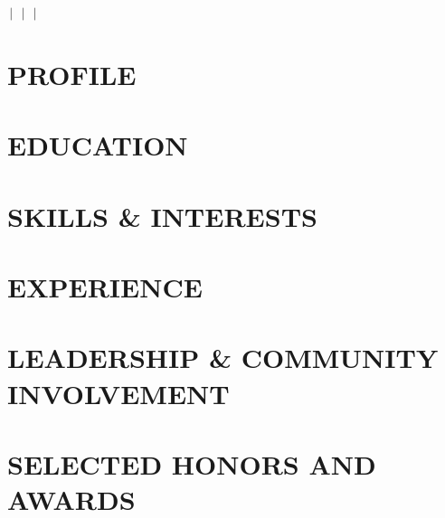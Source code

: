 \documentclass[letterpaper,10pt]{article}
\newcommand{\ShortURL}[1]{%
  \IfSubStr{#1}{://}{%
    \StrBehind{#1}{://}[\urlbody]%
    \urlbody
  }{#1}%
}
\newcommand{\Name}{}
\newcommand{\Title}{}
\newcommand{\Phone}{}
\newcommand{\Email}{}
\newcommand{\Location}{}
\newcommand{\LinkedInURL}{}
\newcommand{\WebsiteURL}{}
\newcommand{\MakeHeader}{%
  \begin{center}
    {\large\bfseries \Name}\\
    \vspace{0.2em}
    {\itshape \Title}\\
    \vspace{0.2em}
    \Phone \,$|$\, 
    \href{mailto:\Email}{\Email} \,$|$\, 
    \href{\LinkedInURL}{\ShortURL{\LinkedInURL}} \,$|$\, 
    \href{\WebsiteURL}{\ShortURL{\WebsiteURL}}\\
    \vspace{0.2em}
    \Location
  \end{center}
}
\newcommand{\ProfileText}{}
\begin{document}


\MakeHeader

\section{PROFILE}
\ProfileText

\section{EDUCATION}
\EducationEntries

\section{SKILLS \& INTERESTS}
\SkillsText

\section{EXPERIENCE}
\ExperienceEntries

\section{LEADERSHIP \& COMMUNITY INVOLVEMENT}
\LeadershipEntries

\section{SELECTED HONORS AND AWARDS}
\begin{itemize}
  \AwardsList
\end{itemize}
\end{document}
